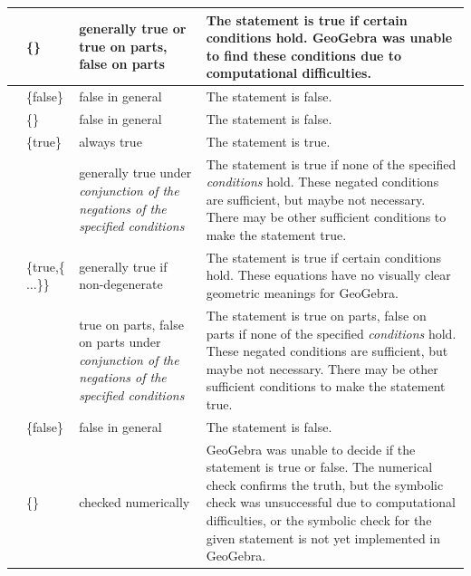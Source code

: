 \documentclass{article}
\begin{document}
\begin{tabular}{|>{\raggedright}m{}|>{\centering}m{}|>{\centering}m{}|>{\centering}m{}|}
\cline{2-4} 
 & {\footnotesize{}\{\}} & {\footnotesize{}generally true or true on parts, false on parts} & {\footnotesize{}The statement is true if certain conditions hold.
GeoGebra was unable to find these conditions due to computational
difficulties.}\tabularnewline
\hline 
\multirow{2}{0.15\textwidth}{\centerline{\footnotesize{}false}} & {\footnotesize{}\{false\}} & {\footnotesize{}false in general} & {\footnotesize{}The statement is false.}\tabularnewline
\cline{2-4} 
 & {\footnotesize{}\{\}} & {\footnotesize{}false in general} & {\footnotesize{}The statement is false.}\tabularnewline
\hline 
\multirow{5}{0.15\textwidth}{\centerline{\footnotesize{}undefined}} & {\footnotesize{}\{true\}} & {\footnotesize{}always true} & {\footnotesize{}The statement is true.}\tabularnewline
\cline{2-4} 
 & \multicolumn{1}{>{\centering}m{0.2\columnwidth}|}{{\footnotesize{}\{true,\{}\emph{\footnotesize{}conditions}{\footnotesize{}\}\}}} & {\footnotesize{}generally true under }\emph{\footnotesize{}conjunction of the negations of the specified
conditions} & {\footnotesize{}The statement is true if none of the specified }\emph{\footnotesize{}conditions}{\footnotesize{}
hold. These negated conditions are sufficient, but maybe not necessary. There
may be other sufficient conditions to make the statement true.}\tabularnewline
\cline{2-4} 
 & {\footnotesize{}\{true,\{$\ldots$\}\}} & {\footnotesize{}generally true if non-degenerate} & {\footnotesize{}The statement is true if certain conditions hold.
These equations have no visually clear geometric meanings for GeoGebra.}\tabularnewline
\cline{2-4} 
 & \multicolumn{1}{>{\centering}m{0.2\columnwidth}|}{{\footnotesize{}\{true,\{}\emph{\footnotesize{}conditions}{\footnotesize{}\},``c''\}}} & {\footnotesize{}true on parts, false on parts under }\emph{\footnotesize{}conjunction of the negations of the specified
conditions} & {\footnotesize{}The statement is true on parts, false on parts if none of the specified }\emph{\footnotesize{}conditions}{\footnotesize{}
hold. These negated conditions are sufficient, but maybe not necessary. There
may be other sufficient conditions to make the statement true.}\tabularnewline
\cline{2-4} 
 & {\footnotesize{}\{false\}} & {\footnotesize{}false in general} & {\footnotesize{}The statement is false.}\tabularnewline
\cline{2-4} 
 & {\footnotesize{}\{\}} & {\footnotesize{}checked numerically} & {\footnotesize{}GeoGebra was unable to decide if the statement is
true or false. The numerical check confirms the truth, but the symbolic
check was unsuccessful due to computational difficulties, or the symbolic
check for the given statement is not yet implemented in GeoGebra.}\tabularnewline
\hline 
\end{tabular}
\end{document}
